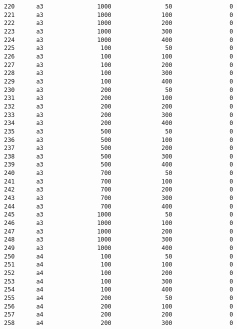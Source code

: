 \documentclass[11pt]{article}
\begin{document}
\begin{Verbatim}[commandchars=\\\{\}]
220      a3               1000               50                0   
221      a3               1000              100                0   
222      a3               1000              200                0   
223      a3               1000              300                0   
224      a3               1000              400                0   
225      a3                100               50                0   
226      a3                100              100                0   
227      a3                100              200                0   
228      a3                100              300                0   
229      a3                100              400                0   
230      a3                200               50                0   
231      a3                200              100                0   
232      a3                200              200                0   
233      a3                200              300                0   
234      a3                200              400                0   
235      a3                500               50                0   
236      a3                500              100                0   
237      a3                500              200                0   
238      a3                500              300                0   
239      a3                500              400                0   
240      a3                700               50                0   
241      a3                700              100                0   
242      a3                700              200                0   
243      a3                700              300                0   
244      a3                700              400                0   
245      a3               1000               50                0   
246      a3               1000              100                0   
247      a3               1000              200                0   
248      a3               1000              300                0   
249      a3               1000              400                0   
250      a4                100               50                0   
251      a4                100              100                0   
252      a4                100              200                0   
253      a4                100              300                0   
254      a4                100              400                0   
255      a4                200               50                0   
256      a4                200              100                0   
257      a4                200              200                0   
258      a4                200              300                0   

\end{Verbatim}
\end{document}
